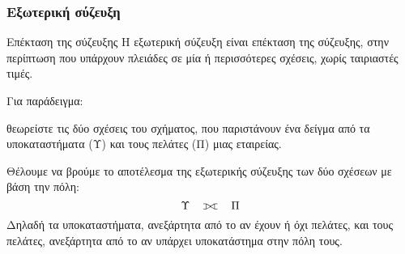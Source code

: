 \begin{frame}
\frametitle{Εξωτερική σύζευξη}
  \begin{block}{Επέκταση της σύζευξης}
    Η εξωτερική σύζευξη είναι επέκταση της σύζευξης, στην περίπτωση που υπάρχουν πλειάδες σε μία
    ή περισσότερες σχέσεις, χωρίς ταιριαστές τιμές. 
  \end{block}
  \begin{exampleblock}{Για παράδειγμα:}
    \par θεωρείστε τις δύο σχέσεις του σχήματος,
    που παριστάνουν ένα δείγμα από τα υποκαταστήματα (Υ) και τους πελάτες (Π)
    μιας εταιρείας.  
    \par Θέλουμε να βρούμε το αποτέλεσμα της εξωτερικής σύζευξης
    των δύο σχέσεων με βάση την πόλη:
    \[ \Upsilon \quad \ojoin \quad \Pi \]
    Δηλαδή τα υποκαταστήματα, ανεξάρτητα από το αν έχουν ή όχι πελάτες,
    και τους πελάτες, ανεξάρτητα από το αν υπάρχει υποκατάστημα στην πόλη τους.
  \end{exampleblock}
\end{frame}



